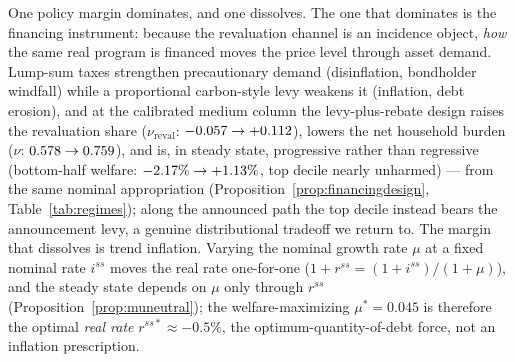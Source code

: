 \documentclass[12pt]{article}
\begin{document}
One policy margin dominates, and one dissolves. The one that dominates is
the financing instrument: because the revaluation channel is an incidence
object, \emph{how} the same real program is financed moves the price level
through asset demand. Lump-sum taxes strengthen precautionary demand
(disinflation, bondholder windfall) while a proportional carbon-style levy
weakens it (inflation, debt erosion), and at the calibrated medium column the
levy-plus-rebate design raises the revaluation share ($\nu_{\mathrm{reval}}$:
$-0.057 \to +0.112$), lowers the net household burden ($\nu$:
$0.578 \to 0.759$), and is, in steady state, progressive rather than regressive (bottom-half
welfare: $-2.17\% \to +1.13\%$, top decile nearly unharmed) ---
from the same nominal appropriation
(Proposition~\ref{prop:financingdesign}, Table~\ref{tab:regimes}); along the
announced path the top decile instead bears the announcement levy, a genuine
distributional tradeoff we return to.
The margin that dissolves is trend inflation. Varying the nominal growth
rate $\mu$ at a fixed nominal rate $i^{ss}$ moves the real rate one-for-one
($1+r^{ss}=(1+i^{ss})/(1+\mu)$), and the steady state depends on $\mu$
only through $r^{ss}$ (Proposition~\ref{prop:muneutral}); the
welfare-maximizing $\mu^{*}=0.045$ is therefore the optimal \emph{real rate}
$r^{ss*}\approx-0.5\%$, the \citet{aiyagarimcgrattan1998}
optimum-quantity-of-debt force, not an inflation prescription.
\end{document}
